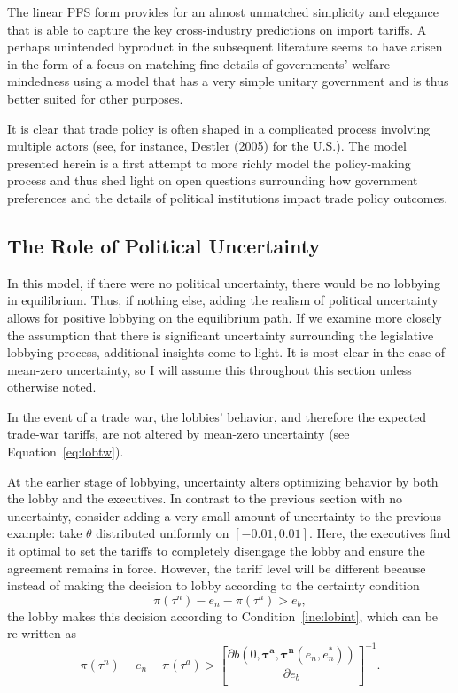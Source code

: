 \documentclass[10pt]{article}
\newcommand{\ve}{\theta}
\newcommand{\bta}{\bm{\tau^a}}
\newcommand{\btn}{\bm{\tau^n}}
\begin{document}
The linear PFS form provides for an almost unmatched simplicity and elegance that is able to capture the key cross-industry predictions on import tariffs. A perhaps unintended byproduct in the subsequent literature seems to have arisen in the form of a focus on matching fine details of governments' welfare-mindedness using a model that has a very simple unitary government and is thus better suited for other purposes.

It is clear that trade policy is often shaped in a complicated process involving multiple actors (see, for instance, Destler (2005) for the U.S.). The model presented herein is a first attempt to more richly model the policy-making process and thus shed light on open questions surrounding how government preferences and the details of political institutions impact trade policy outcomes.


\subsection{The Role of Political Uncertainty}
\label{sec:uncertainty}
In this model, if there were no political uncertainty, there would be no lobbying in equilibrium. Thus, if nothing else, adding the realism of political uncertainty allows for positive lobbying on the equilibrium path. If we examine more closely the assumption that there is significant uncertainty surrounding the legislative lobbying process, additional insights come to light. It is most clear in the case of mean-zero uncertainty, so I will assume this throughout this section unless otherwise noted.

In the event of a trade war, the lobbies' behavior, and therefore the expected trade-war tariffs, are not altered by mean-zero uncertainty (see Equation~\ref{eq:lobtw}).

At the earlier stage of lobbying, uncertainty alters optimizing behavior by both the lobby and the executives. In contrast to the previous section with no uncertainty, consider adding a very small amount of uncertainty to the previous example: take $\ve$ distributed uniformly on $[-0.01,0.01]$. Here, the executives find it optimal to set the tariffs to completely disengage the lobby and ensure the agreement remains in force. However, the tariff level will be different because instead of making the decision to lobby according to the certainty condition
\[\pi(\tau^n) - e_n - \pi(\tau^a) > e_b,
\]
the lobby makes this decision according to Condition~\ref{ine:lobint}, which can be re-written as
\[
\pi(\tau^n) - e_n - \pi(\tau^a) > \left[\frac{\partial b(0,\bta,\btn(e_n,e_n^*))}{\partial e_b}\right]^{-1}.
\]
\end{document}
